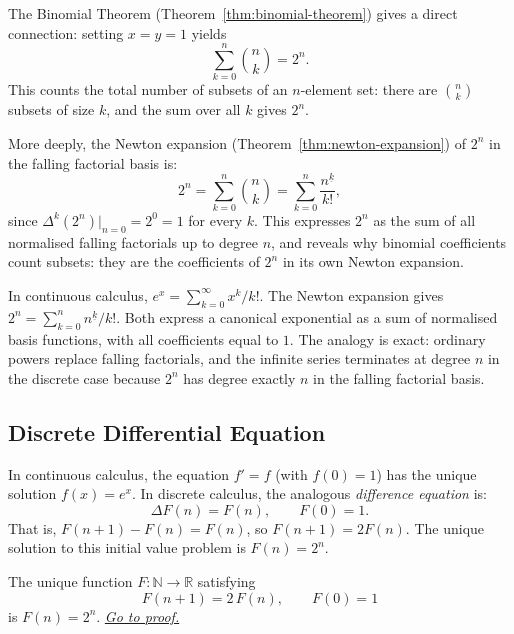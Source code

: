 \begin{exposition}
The Binomial Theorem (Theorem~\ref{thm:binomial-theorem}) gives a direct connection:
setting \(x = y = 1\) yields
\[
\sum_{k=0}^{n} \binom{n}{k} = 2^n.
\]
This counts the total number of subsets of an \(n\)-element set: there are
\(\binom{n}{k}\) subsets of size \(k\), and the sum over all \(k\) gives
\(2^n\).

More deeply, the Newton expansion (Theorem~\ref{thm:newton-expansion}) of \(2^n\)
in the falling factorial basis is:
\[
2^n = \sum_{k=0}^{n} \binom{n}{k} = \sum_{k=0}^{n} \frac{n^{\underline{k}}}{k!},
\]
since \(\Delta^k(2^n)\big|_{n=0} = 2^0 = 1\) for every \(k\). This expresses
\(2^n\) as the sum of all normalised falling factorials up to degree \(n\),
and reveals why binomial coefficients count subsets: they are the coefficients
of \(2^n\) in its own Newton expansion.
\end{exposition}

\begin{remark*}[Interpretation]
In continuous calculus, \(e^x = \sum_{k=0}^{\infty} x^k/k!\). The Newton
expansion gives \(2^n = \sum_{k=0}^{n} n^{\underline{k}}/k!\). Both express
a canonical exponential as a sum of normalised basis functions, with all
coefficients equal to \(1\). The analogy is exact: ordinary powers replace
falling factorials, and the infinite series terminates at degree \(n\) in
the discrete case because \(2^n\) has degree exactly \(n\) in the falling
factorial basis.
\end{remark*}

\subsection*{Discrete Differential Equation}

\begin{exposition}
In continuous calculus, the equation \(f' = f\) (with \(f(0) = 1\)) has the
unique solution \(f(x) = e^x\). In discrete calculus, the analogous
\emph{difference equation} is:
\[
\Delta F(n) = F(n), \qquad F(0) = 1.
\]
That is, \(F(n+1) - F(n) = F(n)\), so \(F(n+1) = 2F(n)\). The unique solution
to this initial value 
problem is \(F(n) = 2^n\).
\end{exposition}

\begin{proposition}
\label{prop:discrete-ivp}
The unique function \(F : \mathbb{N} \to \mathbb{R}\) satisfying
\[
F(n+1) = 2\,F(n), \qquad F(0) = 1
\]
is \(F(n) = 2^n\).
\hyperref[prf:discrete-ivp]{\textit{Go to proof.}}
\end{proposition}

